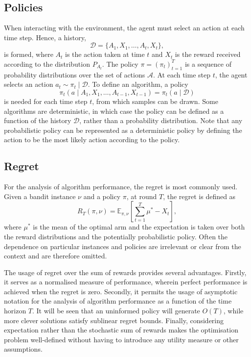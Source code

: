 \subsection{Policies}
When interacting with the environment, the agent must select an action at each time step.
Hence, a history,
\begin{equation}
    \mathcal{D} = \{A_1, X_1, \dots, A_t, X_t\},
\end{equation}
is formed, where $A_t$ is the action taken at time $t$ and $X_t$ is the reward received according to the distribution $P_{A_t}$.
The policy $\pi = (\pi_t)_{t=1}^T$ is a sequence of probability distributions over the set of actions $\mathcal{A}$.
At each time step $t$, the agent selects an action $a_t \sim \pi_t \mid \mathcal{D}$.
To define an algorithm, a policy
\begin{equation}
    \pi_t(a \mid A_1, X_1, \dots, A_{t-1}, X_{t-1}) = \pi_t(a \mid \mathcal{D})
\end{equation}
is needed for each time step $t$, from which samples can be drawn.
Some algorithms are deterministic, in which case the policy can be defined as a function of the history $\mathcal{D}$, rather than a probability distribution.
Note that any probabilistic policy can be represented as a deterministic policy by defining the action to be the most likely action according to the policy.

\subsection{Regret}
For the analysis of algorithm performance, the regret is most commonly used.
Given a bandit instance $\nu$ and a policy $\pi$, at round $T$, the regret is defined as
\begin{equation}
    R_T(\pi, \nu) = \mathbb{E}_{\pi, \nu}\left[\sum_{t=1}^T \mu^* - X_t\right],
    \label{eq:regret1}
\end{equation}
where $\mu^*$ is the mean of the optimal arm and the expectation is taken over both the reward distributions and the potentially probabilistic policy.
Often the dependence on particular instances and policies are irrelevant or clear from the context and are therefore omitted.

The usage of regret over the sum of rewards provides several advantages.
Firstly, it serves as a normalised measure of performance, wherein perfect performance is achieved when the regret is zero.
Secondly, it permits the usage of asymptotic notation for the analysis of algorithm performance as a function of the time horizon $T$.
It will be seen that an uninformed policy will generate $O(T)$, while more clever solutions satisfy sublinear regret bounds.
Finally, considering expectation rather than the stochastic sum of rewards makes the optimisation problem well-defined without having to introduce any utility measure or other assumptions.

